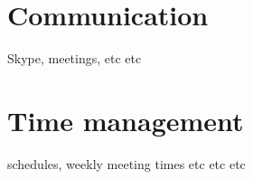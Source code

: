 \section{Communication}


Skype, meetings, etc etc





\section{Time management}

schedules, weekly meeting times etc etc etc